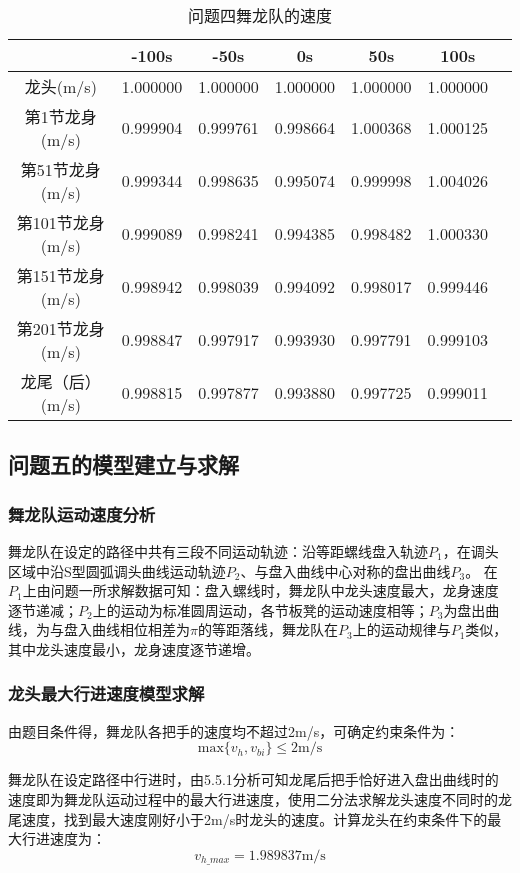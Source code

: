 \documentclass[withoutpreface,bwprint]{cumcmthesis} %
\begin{document}
	\begin{table}[H]
		\centering
		\setlength{\tabcolsep}{12pt}
		\caption{问题四舞龙队的速度} 
		\label{问题四速度} 
		\setlength\extrarowheight{-3pt}
		\small
		\begin{tabular}{|c|c|c|c|c|c|c|}
			\hline
			& -100s& -50s & 0s & 50s & 100s \\ \hline
			龙头(m/s) &1.000000 &1.000000 &1.000000 &1.000000 &1.000000  \\ \hline
			第1节龙身(m/s) & 0.999904&0.999761& 0.998664& 1.000368&1.000125  \\ \hline
			第51节龙身(m/s) &0.999344& 0.998635& 0.995074& 0.999998&1.004026  \\ \hline
			第101节龙身(m/s) &0.999089& 0.998241& 0.994385& 0.998482&1.000330    \\ \hline
			第151节龙身(m/s) &0.998942&0.998039& 0.994092& 0.998017&0.999446    \\ \hline
			第201节龙身(m/s) &0.998847&0.997917& 0.993930& 0.997791&0.999103   \\ \hline
			龙尾（后）(m/s) &0.998815&0.997877 & 0.993880& 0.997725&0.999011   \\ \hline
		\end{tabular}
	\end{table}
	\subsection{问题五的模型建立与求解}
	\subsubsection{舞龙队运动速度分析}
	舞龙队在设定的路径中共有三段不同运动轨迹：沿等距螺线盘入轨迹$P_1$，在调头区域中沿S型圆弧调头曲线运动轨迹$P_2$、与盘入曲线中心对称的盘出曲线$P_3$。
	在$P_1$上由问题一所求解数据可知：盘入螺线时，舞龙队中龙头速度最大，龙身速度逐节递减；$P_2$上的运动为标准圆周运动，各节板凳的运动速度相等；$P_3$为盘出曲线，为与盘入曲线相位相差为$\pi$的等距落线，舞龙队在$P_3$上的运动规律与$P_1$类似，其中龙头速度最小，龙身速度逐节递增。
	\subsubsection{龙头最大行进速度模型求解}
	由题目条件得，舞龙队各把手的速度均不超过2m/s，可确定约束条件为：
	\begin{equation}
		\mbox{max}\{v_h,v_{bi}\}\le 2\mbox{m/s}
	\end{equation}
	
	舞龙队在设定路径中行进时，由5.5.1分析可知龙尾后把手恰好进入盘出曲线时的速度即为舞龙队运动过程中的最大行进速度，使用二分法求解龙头速度不同时的龙尾速度，找到最大速度刚好小于2m/s时龙头的速度。计算龙头在约束条件下的最大行进速度为：
	\begin{equation}
		v_{h\_max}=1.989837\mbox{m/s}
	\end{equation}
\end{document}
